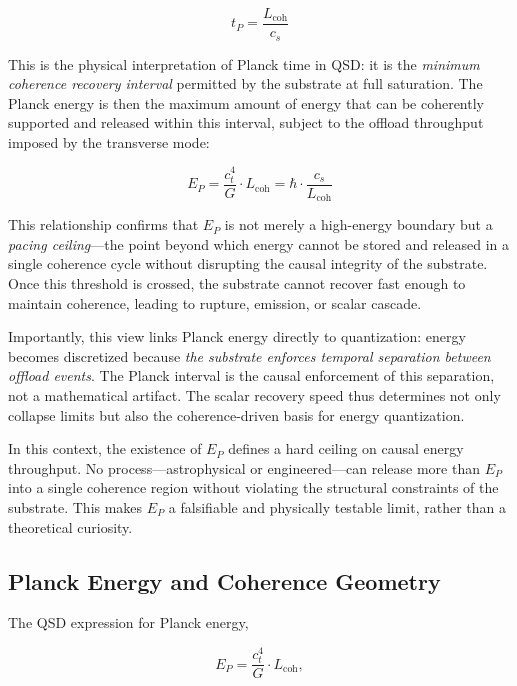 \documentclass[entropy,article,submit,pdftex,moreauthors]{Definitions/mdpi}
\begin{document}
\begin{equation}
t_P = \frac{L_{\text{coh}}}{c_s}
\end{equation}

This is the physical interpretation of Planck time in QSD: it is the \textit{minimum coherence recovery interval} permitted by the substrate at full saturation. The Planck energy is then the maximum amount of energy that can be coherently supported and released within this interval, subject to the offload throughput imposed by the transverse mode:

\begin{equation}
E_P = \frac{c_t^4}{G} \cdot L_{\text{coh}} = \hbar \cdot \frac{c_s}{L_{\text{coh}}}
\end{equation}

This relationship confirms that $E_P$ is not merely a high-energy boundary but a \textit{pacing ceiling}—the point beyond which energy cannot be stored and released in a single coherence cycle without disrupting the causal integrity of the substrate. Once this threshold is crossed, the substrate cannot recover fast enough to maintain coherence, leading to rupture, emission, or scalar cascade.

Importantly, this view links Planck energy directly to quantization: energy becomes discretized because \textit{the substrate enforces temporal separation between offload events}. The Planck interval is the causal enforcement of this separation, not a mathematical artifact. The scalar recovery speed thus determines not only collapse limits but also the coherence-driven basis for energy quantization.

In this context, the existence of $E_P$ defines a hard ceiling on causal energy throughput. No process—astrophysical or engineered—can release more than $E_P$ into a single coherence region without violating the structural constraints of the substrate. This makes $E_P$ a falsifiable and physically testable limit, rather than a theoretical curiosity.

\subsection{Planck Energy and Coherence Geometry}

The QSD expression for Planck energy,

\begin{equation}
E_P = \frac{c_t^4}{G} \cdot L_{\text{coh}},
\end{equation}
\end{document}
